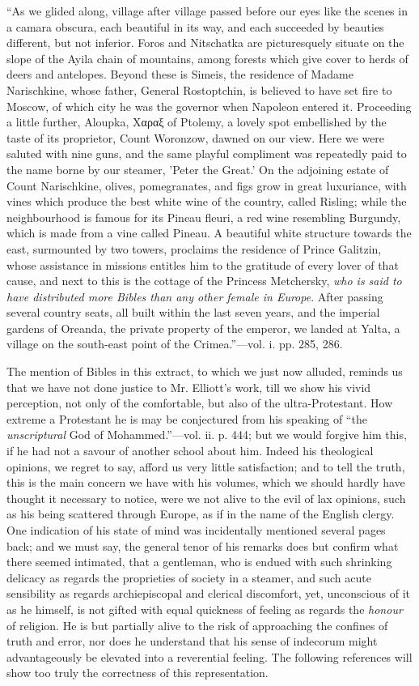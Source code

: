 ``As
we glided along, village after village passed before our eyes like the
scenes in a camara obscura, each beautiful in its way, and each
succeeded by beauties different, but not inferior. Foros and Nitschatka
are picturesquely situate on the slope of the Ayila chain of mountains,
among forests which give cover to herds of deers and antelopes. Beyond
these is Simeis, the residence of Madame Narischkine, whose father,
General Rostoptchin, is believed to have set fire to Moscow, of which
city he was the governor when Napoleon entered it. Proceeding a little
further, Aloupka, Xαραξ of Ptolemy, a lovely spot
embellished by the taste of its proprietor, Count Woronzow, dawned on
our view. Here we were saluted with nine guns, and the same playful
compliment was repeatedly paid to the name borne by our steamer, 'Peter
the Great.' On the adjoining estate of Count Narischkine, olives,
pomegranates, and figs grow in great luxuriance, with vines which
produce the best white wine of the country, called Risling; while the
neighbourhood is famous for its Pineau fleuri, a red wine resembling
Burgundy, which is made from a vine called Pineau. A beautiful white
structure towards the east, surmounted by two towers, proclaims the
residence of Prince Galitzin, whose assistance in missions entitles him
to the gratitude of every lover of that cause, and next to this is the
cottage of the Princess Metchersky, \emph{who is said to have distributed
more Bibles than any other female in Europe}. After passing several
country seats, all built within the last seven years, and the imperial
gardens of Oreanda, the private property of the emperor, we landed at
Yalta, a village on the south-east point of the Crimea.''—vol. i. pp.
285, 286.

The mention
of Bibles in this extract, to which we just now alluded, reminds us that
we have not done justice to Mr. Elliott's work, till we show his vivid
perception, not only of the comfortable, but also of the
ultra-Protestant. How extreme a Protestant he is may be conjectured from
his speaking of ``the \emph{unscriptural} God of Mohammed.''—vol. ii. p.
444; but we would forgive him this, if he had not a savour of another
school about him. Indeed his theological opinions, we regret to say,
afford us very little satisfaction; and to tell the truth, this is the
main concern we have with his volumes, which we should hardly have
thought it necessary to notice, were we not alive to the evil of lax
opinions, such as his being scattered through Europe, as if in the name
of the English clergy. One indication of his state of mind was
incidentally mentioned several pages back; and we must say, the general
tenor of his remarks does but confirm what there seemed intimated, that
a gentleman, who is endued with such shrinking delicacy as regards the
proprieties of society in a steamer, and such acute sensibility as
regards archiepiscopal and clerical discomfort, yet, unconscious of it
as he himself, is not gifted with equal quickness of feeling as regards
the \emph{honour} of religion. He is but partially alive to the risk of
approaching the confines of truth and error, nor does he understand that
his sense of indecorum might advantageously be elevated into a
reverential feeling. The following references will show too truly the
correctness of this representation.

